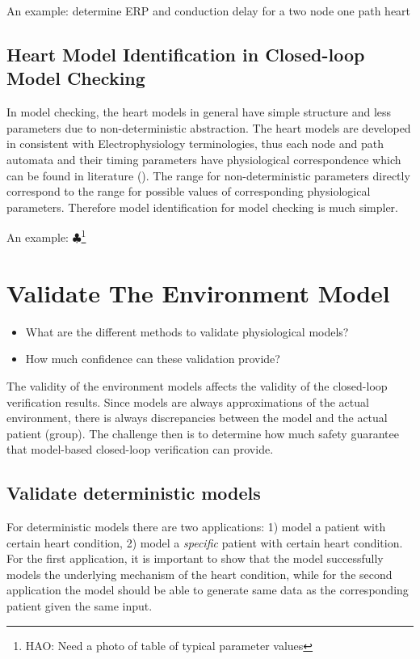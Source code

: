\documentclass[openany]{now} %
\newcommand{\Hao}[1]{$\clubsuit$\footnote{HAO: #1}}
\begin{document}
An example: determine ERP and conduction delay for a two node one path heart
\section{Heart Model Identification in Closed-loop Model Checking}
In model checking, the heart models in general have simple structure and less parameters due to non-deterministic abstraction. The heart models are developed in consistent with Electrophysiology terminologies, thus each node and path automata and their timing parameters have physiological correspondence which can be found in literature (\cite{josephson}). The range for non-deterministic parameters directly correspond to the range for possible values of corresponding physiological parameters. Therefore model identification for model checking is much simpler. 

An example: \Hao{Need a photo of table of typical parameter values}







\chapter{Validate The Environment Model}
\begin{itemize}
	\item What are the different methods to validate physiological models?
    \item How much confidence can these validation provide?
\end{itemize}
The validity of the environment models affects the validity of the closed-loop verification results. Since models are always approximations of the actual environment, there is always discrepancies between the model and the actual patient (group). The challenge then is to determine how much safety guarantee that model-based closed-loop verification can provide. 

\section{Validate deterministic models}
For deterministic models there are two applications: 1) model a patient with certain heart condition, 2) model a \emph{specific} patient with certain heart condition. For the first application, it is important to show that the model successfully models the underlying mechanism of the heart condition, while for the second application the model should be able to generate same data as the corresponding patient given the same input. 
\end{document}

